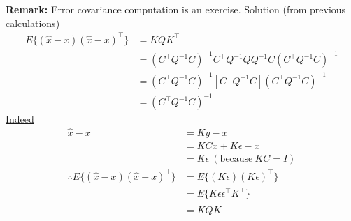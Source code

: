 \documentclass[letterpaper]{article}
\begin{document}
    \textbf{Remark:} Error covariance computation is an exercise. Solution (from previous calculations)
    \begin{align*}
        E\{\left(\hat{x}-x\right)\left(\hat{x}-x\right)^\top\}&=KQK^\top\\
        &=\left(C^\top Q^{-1}C\right)^{-1}C^\top Q^{-1}QQ^{-1}C\left(C^\top Q^{-1}C\right)^{-1}\\
        &=\left(C^\top Q^{-1}C\right)^{-1}\left[C^\top Q^{-1}C\right]\left(C^\top Q^{-1}C\right)^{-1}\\
        &=\left(C^\top Q^{-1}C\right)^{-1}
    \end{align*}
    \underline{Indeed}
    \begin{align*}
        \hat{x}-x&=Ky-x\\
        &=KCx+K\epsilon-x\\
        &=K\epsilon~(\text{because}~KC=I)\\
        \therefore E\{(\hat{x}-x)(\hat{x}-x)^\top\}&=E\{(K\epsilon)(K\epsilon)^\top\}\\
        &=E\{K\epsilon\epsilon^\top K^\top\}\\
        &=KQK^\top
    \end{align*}
\end{document}
